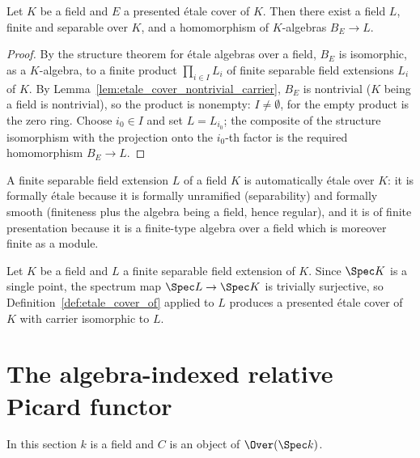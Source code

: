 \begin{theorem}
  \label{thm:etale_cover_field_cofinality}
  \leanok
  Let \(K\) be a field and \(E\) a presented \'etale cover of \(K\). Then there exist a field
  \(L\), finite and separable over \(K\), and a homomorphism of \(K\)-algebras
  \(B_E \to L\).
\end{theorem}
\begin{proof}
  \leanok
  By the structure theorem for \'etale algebras over a field, \(B_E\) is isomorphic, as a
  \(K\)-algebra, to a finite product \(\prod_{i \in I} L_i\) of finite separable field
  extensions \(L_i\) of \(K\). By Lemma~\ref{lem:etale_cover_nontrivial_carrier}, \(B_E\) is
  nontrivial (\(K\) being a field is nontrivial), so the product is nonempty: \(I \neq
  \emptyset\), for the empty product is the zero ring. Choose \(i_0 \in I\) and set
  \(L = L_{i_0}\); the composite of the structure isomorphism with the projection onto the
  \(i_0\)-th factor is the required homomorphism \(B_E \to L\).
\end{proof}

A finite separable field extension \(L\) of a field \(K\) is automatically \'etale over \(K\):
it is formally \'etale because it is formally unramified (separability) and formally smooth
(finiteness plus the algebra being a field, hence regular), and it is of finite presentation
because it is a finite-type algebra over a field which is moreover finite as a module.

\begin{definition}
  \label{def:etale_cover_ofField}
  \leanok
  Let \(K\) be a field and \(L\) a finite separable field extension of \(K\). Since \(\Spec K\)
  is a single point, the spectrum map \(\Spec L \to \Spec K\) is trivially surjective, so
  Definition~\ref{def:etale_cover_of} applied to \(L\) produces a presented \'etale cover of
  \(K\) with carrier isomorphic to \(L\).
\end{definition}

\section{The algebra-indexed relative Picard functor}

In this section \(k\) is a field and \(C\) is an object of \(\Over(\Spec k)\).

